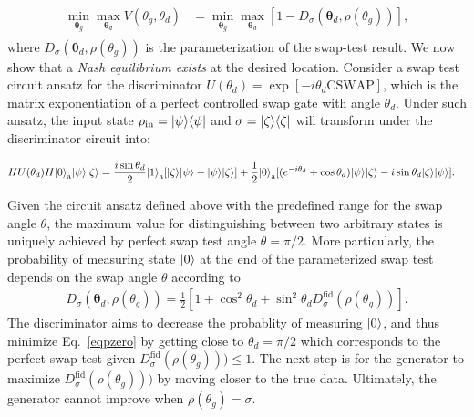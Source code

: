 \documentclass[prl,superscriptaddress,twocolumn]{revtex4}
\makeatletter
\newcommand{\sket}[1]{{\ensuremath{\lvert#1\rangle}}}
\newcommand{\lket}[1]{{\ensuremath{\left\lvert#1\right\rangle}}}
\newcommand{\ket}[1]{\if@display\lket{#1}\else\sket{#1}\fi}
\newcommand{\sbra}[1]{{\ensuremath{\langle#1\rvert}}}
\newcommand{\lbra}[1]{{\ensuremath{\left\langle#1\right\rvert}}}
\newcommand{\bra}[1]{\if@display\lbra{#1}\else\sbra{#1}\fi}
\theoremstyle{plain}
\theoremstyle{definition}
\makeatother
\begin{document}
\begin{align}
\begin{split}
\label{eq:eqgan}
  \min_{\mathbf{\theta}_g}\max_{\mathbf{\theta}_d} V(\theta_g, \theta_d)  &=\min_{\mathbf{\theta}_g}\max_{\mathbf{\theta}_d} [1-  D_\sigma(\mathbf{\theta}_d, \rho(\theta_g))],
\end{split}
\end{align}
where $D_\sigma(\mathbf{\theta}_d, \rho(\theta_g))$ is the parameterization of the swap-test result.
We now show that a \emph{Nash equilibrium exists} at the desired location.  Consider a swap test circuit ansatz for the discriminator $U(\theta_d)=\exp[-i\theta_d\text{CSWAP}]$, which is the matrix exponentiation of a perfect controlled swap gate with angle $\theta_d$. Under such ansatz, the  input state $\rho_{\text{in}}=\ket{\psi}\bra{\psi}$ and $\sigma=\ket{\zeta}\bra{\zeta}$ will transform under the discriminator circuit into:
\begin{widetext}
\begin{align}\label{eq:discriminatorcircuit}
&H U(\theta_d)H\ket{0}_\text{a}\ket{\psi}\ket{\zeta}=\frac{i\sin\theta_d}{2} \ket{1}_{\text{a}}[\ket{\zeta}\ket{\psi}-\ket{\psi}\ket{\zeta}]  + \frac{1}{2}\ket{0}_{\text{a}}[(e^{-i\theta_d} +\cos\theta_d)  \ket{\psi}\ket{\zeta} - i \sin\theta_d\ket{\zeta}\ket{\psi}].
\end{align} 
\end{widetext}
Given the circuit ansatz defined above  with the predefined range for the swap angle $\theta$, the maximum value for distinguishing between two arbitrary states is uniquely achieved by perfect swap test angle $\theta=\pi/2$. More particularly, the probability of measuring state $\ket{0}$ at the end of the parameterized swap test depends on the swap angle $\theta$ according to
\begin{align}\label{eqpzero}
   D_\sigma(\mathbf{\theta}_d, \rho(\theta_g)) =\frac{1}{2}[1+\cos^2\theta_d + \sin^2\theta_d D_\sigma^\mathrm{fid}(\rho(\theta_g))].
\end{align}
The discriminator aims to decrease the probablity of measuring $\ket{0}$, and thus minimize Eq.~\ref{eqpzero} by getting close to $\theta_d =\pi/2$ which corresponds to the perfect swap test given $D_\sigma^\mathrm{fid}(\rho(\theta_g)))\leq 1$. The next step is for the generator to maximize $D_\sigma^\mathrm{fid}(\rho(\theta_g)))$ by moving closer to the true data.
Ultimately, the generator cannot improve when $\rho(\theta_g) = \sigma$.
\end{document}

